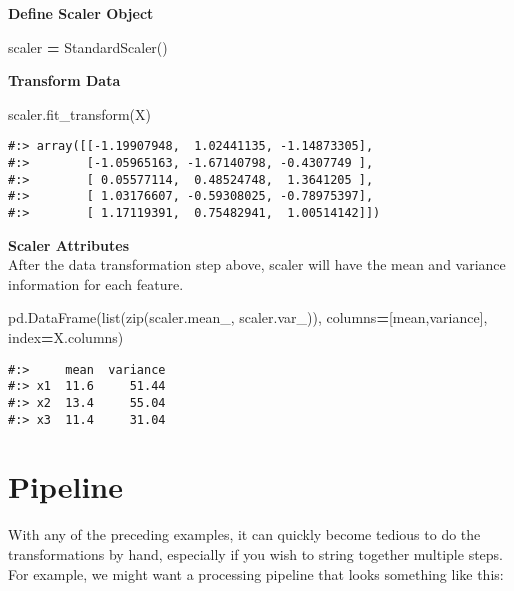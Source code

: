\documentclass[
]{book}
\newenvironment{Shaded}{\begin{snugshade}}{\end{snugshade}}
\newcommand{\BuiltInTok}[1]{#1}
\newcommand{\NormalTok}[1]{#1}
\newcommand{\OperatorTok}[1]{\textcolor[rgb]{0.43,0.43,0.43}{\textbf{#1}}}
\newcommand{\StringTok}[1]{\textcolor[rgb]{0.5,0.5,0.5}{#1}}
\begin{document}
\textbf{Define Scaler Object}

\begin{Shaded}
\begin{Highlighting}[]
\NormalTok{scaler }\OperatorTok{=}\NormalTok{ StandardScaler()}
\end{Highlighting}
\end{Shaded}

\textbf{Transform Data}

\begin{Shaded}
\begin{Highlighting}[]
\NormalTok{scaler.fit\_transform(X)}
\end{Highlighting}
\end{Shaded}

\begin{verbatim}
#:> array([[-1.19907948,  1.02441135, -1.14873305],
#:>        [-1.05965163, -1.67140798, -0.4307749 ],
#:>        [ 0.05577114,  0.48524748,  1.3641205 ],
#:>        [ 1.03176607, -0.59308025, -0.78975397],
#:>        [ 1.17119391,  0.75482941,  1.00514142]])
\end{verbatim}

\textbf{Scaler Attributes}\\
After the data transformation step above, scaler will have the mean and variance information for each feature.

\begin{Shaded}
\begin{Highlighting}[]
\NormalTok{pd.DataFrame(}\BuiltInTok{list}\NormalTok{(}\BuiltInTok{zip}\NormalTok{(scaler.mean\_, scaler.var\_)), }
\NormalTok{             columns}\OperatorTok{=}\NormalTok{[}\StringTok{\textquotesingle{}mean\textquotesingle{}}\NormalTok{,}\StringTok{\textquotesingle{}variance\textquotesingle{}}\NormalTok{], }
\NormalTok{             index}\OperatorTok{=}\NormalTok{X.columns)}
\end{Highlighting}
\end{Shaded}

\begin{verbatim}
#:>     mean  variance
#:> x1  11.6     51.44
#:> x2  13.4     55.04
#:> x3  11.4     31.04
\end{verbatim}

\hypertarget{pipeline}{%
\section{Pipeline}\label{pipeline}}

With any of the preceding examples, it can quickly become tedious to do the transformations by hand, especially if you wish to string together multiple steps. For example, we might want a processing pipeline that looks something like this:
\end{document}
